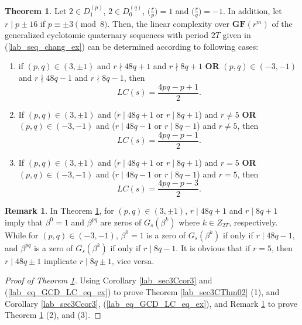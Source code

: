\documentclass{mcom-l}
\theoremstyle{definition}
\newtheorem{sec3Cremark3}[sec3_remark1]{Remark}
\newtheorem{sec3CThm03}[sec3thm1]{Theorem}
\numberwithin{equation}{section}
\begin{document}
    \begin{sec3CThm03}\label{lab_sec3CThm03}
     Let $ 2\in D_{1}^{(p)} $, $ 2\in D_{0}^{(q)} $, $ \bigl(\tfrac{r}{p}\bigr) =1$ and $ \bigl(\tfrac{r}{q}\bigr) =-1$. In addition, let  $ r\mid p\pm 16 $ if $ p\equiv\pm 3\pmod 8 $. Then, the linear complexity over $\mathbf{GF}(r^{m}) $ of the generalized cyclotomic quaternary sequences with period $ 2T $ given in (\ref{lab_seq_chang_ex}) can be determined according to following cases:
     \begin{enumerate} \item if $ (p,q)\in (3,\pm 1) $ and $ r\nmid 48q+1 $ and $ r\nmid 8q+1 $ \textbf{OR} $ (p,q)\in (-3,-1) $ and $ r\nmid 48q-1 $ and $ r\nmid 8q-1 $, then 
     \begin{equation*}
     LC(s)=\frac{4pq-p+1}{2}.
     \end{equation*}
     
       \item If $ (p,q)\in (3,\pm 1) $ and ($ r\mid 48q+1 $ or $ r\mid 8q+1 $) and $ r\ne 5 $ \textbf{OR} $ (p,q)\in (-3,-1) $ and ($ r\mid 48q-1 $ or $ r\mid 8q-1 $) and $ r\ne 5 $, then
      \begin{equation*}
       LC(s)=\frac{4pq-p-1}{2}.
       \end{equation*}
       
         \item If $ (p,q)\in (3,\pm 1) $  and ($ r\mid 48q+1 $ or $ r\mid 8q+1 $) and $ r=5 $ \textbf{OR} $ (p,q)\in (-3,-1) $ and ($ r\mid 48q-1 $ or $ r\mid 8q-1 $) and $ r=5 $, then
        \begin{equation*}
           LC(s)=\frac{4pq-p-3}{2}.
           \end{equation*}
       \end{enumerate}
        \end{sec3CThm03}
    \begin{sec3Cremark3}\label{Lab_sec3Cremark3}
    In Theorem \ref{lab_sec3CThm03}, for $ (p,q)\in (3,\pm 1) $, $ r\mid 48q+1 $ and $ r\mid 8q+1 $ imply that $ \beta^{0}=1 $ and $ \beta^{pq}$ are zeros of $ G_{s}(\beta^{k}) $ where $ k\in Z_{2T} $, respectively. While for $ (p,q)\in (-3,-1) $, $ \beta^{0}=1 $ is a zero of $ G_{s}(\beta^{k}) $ if only if $ r\mid 48q-1 $, and $ \beta^{pq}$ is a zero of $ G_{s}(\beta^{k}) $ if only if $ r\mid 8q-1 $. It is obvious that if $ r=5 $, then $ r\mid 48q\pm 1 $ implicate $ r\mid 8q\pm 1 $, vice versa.
    \end{sec3Cremark3}
    \begin{proof}[Proof of Theorem \ref{lab_sec3CThm03}]
            Using Corollary \ref{lab_sec3Ccor3} and (\ref{lab_eq_GCD_LC_eq_ex}) to prove Theorem \ref{lab_sec3CThm02} (1), and  Corollary \ref{lab_sec3Ccor3}, (\ref{lab_eq_GCD_LC_eq_ex}), and Remark \ref{Lab_sec3Cremark3} to prove Theorem \ref{lab_sec3CThm03} (2), and (3).
     \end{proof}
\end{document}

